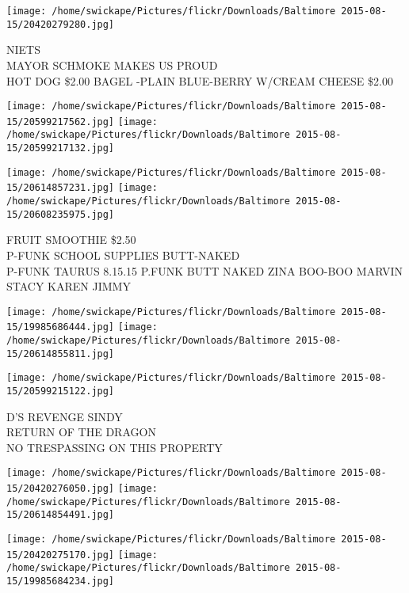 \documentclass[10pt,letterpaper]{article}
\begin{document}
\vspace{0.25in}
\texttt{[image: /home/swickape/Pictures/flickr/Downloads/Baltimore 2015-08-15/20420279280.jpg]}

NIETS\\
MAYOR SCHMOKE MAKES US PROUD\\
HOT DOG \$2.00 BAGEL {-}PLAIN BLUE{-}BERRY W/CREAM CHEESE \$2.00\\
\pagebreak

\texttt{[image: /home/swickape/Pictures/flickr/Downloads/Baltimore 2015-08-15/20599217562.jpg]}
\texttt{[image: /home/swickape/Pictures/flickr/Downloads/Baltimore 2015-08-15/20599217132.jpg]}

\texttt{[image: /home/swickape/Pictures/flickr/Downloads/Baltimore 2015-08-15/20614857231.jpg]}
\texttt{[image: /home/swickape/Pictures/flickr/Downloads/Baltimore 2015-08-15/20608235975.jpg]}

FRUIT SMOOTHIE \$2.50\\
P{-}FUNK SCHOOL SUPPLIES BUTT{-}NAKED\\
P{-}FUNK TAURUS 8.15.15 P.FUNK BUTT NAKED ZINA BOO{-}BOO MARVIN\\
STACY KAREN JIMMY\\
\pagebreak

\texttt{[image: /home/swickape/Pictures/flickr/Downloads/Baltimore 2015-08-15/19985686444.jpg]}
\texttt{[image: /home/swickape/Pictures/flickr/Downloads/Baltimore 2015-08-15/20614855811.jpg]}

\vspace{0.25in}
\texttt{[image: /home/swickape/Pictures/flickr/Downloads/Baltimore 2015-08-15/20599215122.jpg]}

D'S REVENGE SINDY\\
RETURN OF THE DRAGON\\
NO TRESPASSING ON THIS PROPERTY\\
\pagebreak

\texttt{[image: /home/swickape/Pictures/flickr/Downloads/Baltimore 2015-08-15/20420276050.jpg]}
\texttt{[image: /home/swickape/Pictures/flickr/Downloads/Baltimore 2015-08-15/20614854491.jpg]}

\texttt{[image: /home/swickape/Pictures/flickr/Downloads/Baltimore 2015-08-15/20420275170.jpg]}
\texttt{[image: /home/swickape/Pictures/flickr/Downloads/Baltimore 2015-08-15/19985684234.jpg]}
\end{document}
